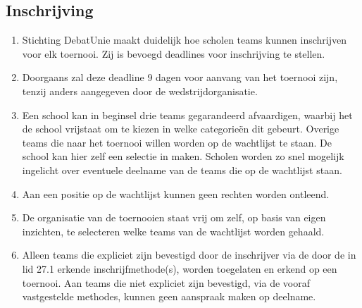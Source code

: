 \subsection{Inschrijving}

\begin{enumerate}
\item Stichting DebatUnie maakt duidelijk hoe scholen teams kunnen inschrijven voor elk toernooi. Zij is bevoegd deadlines voor inschrijving te stellen.
\item Doorgaans zal deze deadline 9 dagen voor aanvang van het toernooi zijn, tenzij anders aangegeven door de wedstrijdorganisatie.
\item Een school kan in beginsel drie teams gegarandeerd afvaardigen, waarbij het de school vrijstaat om te kiezen in welke categorieën dit gebeurt. Overige teams die naar het toernooi willen worden op de wachtlijst te staan. De school kan hier zelf een selectie in maken. Scholen worden zo snel mogelijk ingelicht over eventuele deelname van de teams die op de wachtlijst staan.
\item Aan een positie op de wachtlijst kunnen geen rechten worden ontleend.
\item De organisatie van de toernooien staat vrij om zelf, op basis van eigen inzichten, te selecteren welke teams van de wachtlijst worden gehaald.
\item Alleen teams die expliciet zijn bevestigd door de inschrijver via de door de in lid 27.1 erkende inschrijfmethode(s), worden toegelaten en erkend op een toernooi. Aan teams die niet expliciet zijn bevestigd, via de vooraf vastgestelde methodes, kunnen geen aanspraak maken op deelname.
\end{enumerate}
